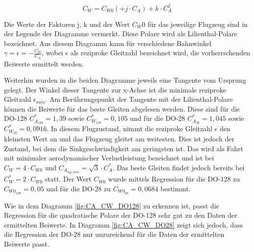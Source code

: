 \begin{equation}
C_W = C_{W0} (+ j \cdot C_A) + k \cdot C_{A}^2
\end{equation}

Die Werte der Faktoren j, k und der Wert $C_W0$ für das jeweilige Flugzeug sind in der Legende der Diagramme vermerkt. Diese Polare wird als Lilienthal-Polare bezeichnet. Aus diesem Diagramm kann für verschiedene Bahnwinkel $\gamma = \epsilon = - \frac{C_W}{C_A}$, wobei $\epsilon$ als reziproke Gleitzahl bezeichnet wird, die vorherrschenden Beiwerte ermittelt werden. 

Weiterhin wurden in die beiden Diagramme jeweils eine Tangente vom Ursprung gelegt. Der Winkel dieser Tangente zur x-Achse ist die minimale reziproke Gleitzahl $\epsilon_{min}$. Am Berührungspunkt der Tangente mit der Lilienthal-Polare können die Beiwerte für das beste Gleiten abgelesen werden. Diese sind für die DO-128 $C_{A_{128}}^* = 1,39$ sowie $C_{W_{128}}^* = 0,105$ und für die DO-28 $C_{A_{28}}^* = 1,045$ sowie $C_{W_{28}}^* = 0,0916$. In diesem Flugzustand, nimmt die reziproke Gleitzahl $\epsilon$ den kleinsten Wert an und das Flugzeug gleitet am weitesten. Dies ist jedoch der Zustand, bei dem die Sinkgeschwindigkeit am geringsten ist. Das wird als Fahrt mit minimaler aerodynamischer Verlustleistung bezeichnet und ist bei $C_W = 4 \cdot C_{W0}$ und $C_{A_{wg,min}} = \sqrt{3} \cdot C_A^*$. Das beste Gleiten findet jedoch bereits bei $C_W^* = 2 \cdot C_{W0}$ statt. Der Wert $C_{W0}$ wurde mittels Regression für die DO-128 zu $C_{W0_{128}} = 0,05$ und für die DO-28 zu $C_{W0_{28}} = 0,0684$ bestimmt. 


Wie in dem Diagramm \ref{fig:CA_CW_DO128} zu erkennen ist, passt die Regression für die quadratische Polare der DO-128 sehr gut zu den Daten der ermittelten Beiwerte. In Diagramm \ref{fig:CA_CW_DO28} zeigt sich jedoch, dass die Regression der DO-28 nur unzureichend für die Daten der ermittelten Beiwerte passt.


